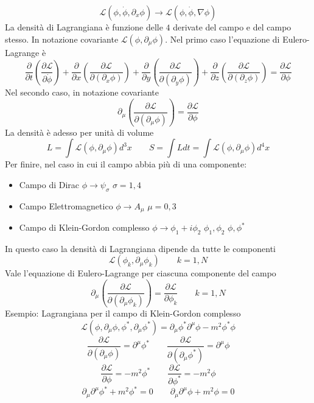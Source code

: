 $$
\mathcal{L}(\phi, \dot{\phi}, \partial_x \phi) \to \mathcal{L}(\phi, \dot{\phi}, \nabla\phi)
$$
La densità di Lagrangiana è funzione delle $4$ derivate del campo e del campo stesso. In notazione covariante $\mathcal{L}\left(\phi,\partial_\mu\phi\right)$. Nel primo caso l'equazione di Eulero-Lagrange è
$$
\frac{\partial}{\partial t} \left( \frac{\partial \mathcal{L}}{\partial \dot{\phi}} \right) + \frac{\partial}{\partial x} \left( \frac{\partial \mathcal{L}}{\partial (\partial_x \phi)} \right) + \frac{\partial}{\partial y} \left( \frac{\partial \mathcal{L}}{\partial (\partial_y \phi)} \right) + \frac{\partial}{\partial z} \left( \frac{\partial \mathcal{L}}{\partial (\partial_z \phi)} \right) = \frac{\partial \mathcal{L}}{\partial \phi}
$$
Nel secondo caso, in notazione covariante
$$
\partial_\mu \left( \frac{\partial \mathcal{L}}{\partial (\partial_\mu \phi)} \right) = \frac{\partial \mathcal{L}}{\partial \phi}
$$
La densità è adesso per unità di volume
$$
L = \int \mathcal{L}(\phi, \partial_\mu \phi) d^3x \qquad S = \int L dt = \int \mathcal{L}(\phi, \partial_\mu \phi) d^4x
$$
Per finire, nel caso in cui il campo abbia più di una componente:
\begin{itemize}
    \item Campo di Dirac $\phi\to\psi_\sigma$ $\sigma=1,4$
    \item Campo Elettromagnetico $\phi\to A_\mu$ $\mu=0,3$
    \item Campo di Klein-Gordon complesso $\phi\to\phi_1+i\phi_2$ $\phi_1, \phi_2$ $\phi,\phi^*$
\end{itemize}
In questo caso la densità di Lagrangiana dipende da tutte le componenti
$$
\mathcal{L}(\phi_k, \partial_\mu \phi_k) \qquad k = 1,N
$$
Vale l'equazione di Eulero-Lagrange per ciascuna componente del campo
$$
\partial_\mu \left( \frac{\partial \mathcal{L}}{\partial (\partial_\mu \phi_k)} \right) = \frac{\partial \mathcal{L}}{\partial \phi_k} \qquad k = 1,N
$$
Esempio: Lagrangiana per il campo di Klein-Gordon complesso
$$
\mathcal{L}(\phi, \partial_\mu \phi, \phi^*, \partial_\mu \phi^*) = \partial_\mu \phi^* \partial^\mu \phi - m^2 \phi^* \phi
$$
$$
\frac{\partial \mathcal{L}}{\partial (\partial_\mu \phi)} = \partial^\mu \phi^* \qquad \frac{\partial \mathcal{L}}{\partial (\partial_\mu \phi^*)} = \partial^\mu \phi
$$
$$
\frac{\partial \mathcal{L}}{\partial \phi} = -m^2 \phi^*  \qquad \frac{\partial \mathcal{L}}{\partial \phi^*} = -m^2 \phi
$$
$$
\partial_\mu \partial^\mu \phi^* + m^2 \phi^* = 0 \qquad \partial_\mu \partial^\mu \phi + m^2 \phi = 0
$$
